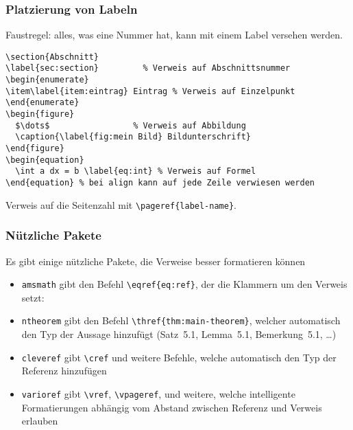 \begin{frame}[fragile]
  \frametitle{Platzierung von Labeln}

  \onslide<+->

  Faustregel: alles, was eine Nummer hat, kann mit einem Label versehen werden.

  \onslide<+->
\begin{lstlisting}
\section{Abschnitt}
\label{sec:section}         % Verweis auf Abschnittsnummer
\begin{enumerate}
\item\label{item:eintrag} Eintrag % Verweis auf Einzelpunkt
\end{enumerate}
\begin{figure}
  $\dots$                 % Verweis auf Abbildung
  \caption{\label{fig:mein Bild} Bildunterschrift}
\end{figure}
\begin{equation}
  \int a dx = b \label{eq:int} % Verweis auf Formel
\end{equation} % bei align kann auf jede Zeile verwiesen werden
\end{lstlisting}

  \onslide<+->

  Verweis auf die Seitenzahl mit \lstinline!\pageref{label-name}!.

\end{frame}

\begin{frame}[fragile]
  \frametitle{Nützliche Pakete}

  \onslide<+->

  Es gibt einige nützliche Pakete, die Verweise besser formatieren können

  \begin{itemize}
  \item<+-> \lstinline!amsmath! gibt den Befehl \lstinline!\eqref{eq:ref}!, der die Klammern um den Verweis setzt: %
  \item<+-> \lstinline!ntheorem! gibt den Befehl \lstinline!\thref{thm:main-theorem}!,
    welcher automatisch den Typ der Aussage hinzufügt (Satz~5.1, Lemma~5.1, Bemerkung~5.1,
    \dots)
  \item<+-> \lstinline!cleveref! gibt \lstinline!\cref! und weitere Befehle, welche
    automatisch den Typ der Referenz hinzufügen
  \item<+-> \lstinline!varioref! gibt \lstinline!\vref!, \lstinline!\vpageref!, und
    weitere, welche intelligente Formatierungen abhängig vom Abstand zwischen Referenz und
    Verweis erlauben
  \end{itemize}

\end{frame}

